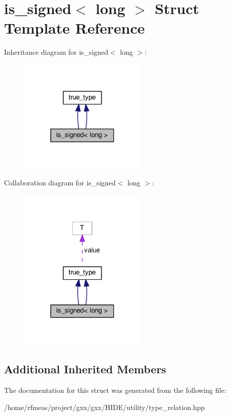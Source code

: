 \hypertarget{structis__signed_3_01long_01_4}{}\section{is\+\_\+signed$<$ long $>$ Struct Template Reference}
\label{structis__signed_3_01long_01_4}


Inheritance diagram for is\+\_\+signed$<$ long $>$\+:
\nopagebreak
\begin{figure}[H]
\begin{center}
\leavevmode
\includegraphics[width=174pt]{structis__signed_3_01long_01_4__inherit__graph}
\end{center}
\end{figure}


Collaboration diagram for is\+\_\+signed$<$ long $>$\+:
\nopagebreak
\begin{figure}[H]
\begin{center}
\leavevmode
\includegraphics[width=174pt]{structis__signed_3_01long_01_4__coll__graph}
\end{center}
\end{figure}
\subsection*{Additional Inherited Members}


The documentation for this struct was generated from the following file\+:\begin{DoxyCompactItemize}
\item 
/home/rfmeas/project/gxx/gxx/\+H\+I\+D\+E/utility/type\+\_\+relation.\+hpp\end{DoxyCompactItemize}
